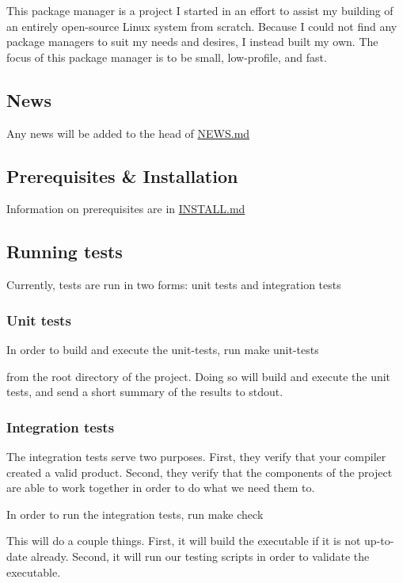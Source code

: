 This package manager is a project I started in an effort to assist my building of an entirely open-\/source Linux system from scratch. Because I could not find any package managers to suit my needs and desires, I instead built my own. The focus of this package manager is to be small, low-\/profile, and fast.

\subsection*{News}

Any news will be added to the head of \mbox{\hyperlink{md_NEWS}{N\+E\+WS.md}}

\subsection*{Prerequisites \& Installation}

Information on prerequisites are in \mbox{\hyperlink{md_INSTALL}{I\+N\+S\+T\+A\+LL.md}}

\subsection*{Running tests}

Currently, tests are run in two forms\+: unit tests and integration tests

\subsubsection*{Unit tests}

In order to build and execute the unit-\/tests, run make unit-\/tests

from the root directory of the project. Doing so will build and execute the unit tests, and send a short summary of the results to stdout.

\subsubsection*{Integration tests}

The integration tests serve two purposes. First, they verify that your compiler created a valid product. Second, they verify that the components of the project are able to work together in order to do what we need them to.

In order to run the integration tests, run make check

This will do a couple things. First, it will build the executable if it is not up-\/to-\/date already. Second, it will run our testing scripts in order to validate the executable.

